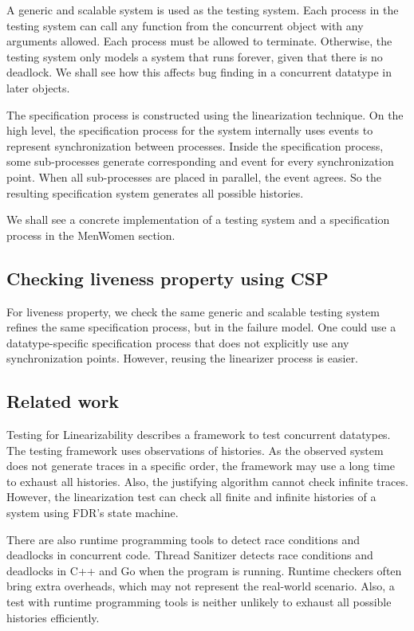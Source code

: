 \documentclass[a4paper, 12pt]{article}
\begin{document}
A generic and scalable system is used as the testing system. Each process in the testing system can call any function from the concurrent object with any arguments allowed. Each process must be allowed to terminate. Otherwise, the testing system only models a system that runs forever, given that there is no deadlock. We shall see how this affects bug finding in a concurrent datatype in later objects.

The specification process is constructed using the linearization technique. On the high level, the specification process for the system internally uses  events to represent synchronization between processes. Inside the specification process, some sub-processes generate corresponding  and  event for every synchronization point. When all sub-processes are placed in parallel, the  event agrees. So the resulting specification system generates all possible histories. 

We shall see a concrete implementation of a testing system and a specification process in the MenWomen section. 

\subsection{Checking liveness property using CSP}
For liveness property, we check the same generic and scalable testing system refines the same specification process, but in the failure model. One could use a datatype-specific specification process that does not explicitly use any synchronization points. However, reusing the linearizer process is easier. 

\subsection{Related work}
Testing for Linearizability \cite{linearizability-testing} describes a framework to test concurrent datatypes. The testing framework uses observations of histories. As the observed system does not generate traces in a specific order, the framework may use a long time to exhaust all histories. Also, the justifying algorithm cannot check infinite traces. However, the linearization test can check all finite and infinite histories of a system using FDR's state machine. 

There are also runtime programming tools to detect race conditions and deadlocks in concurrent code. Thread Sanitizer \cite{threadsanitizer} detects race conditions and deadlocks in C++ and Go when the program is running. Runtime checkers often bring extra overheads, which may not represent the real-world scenario. Also, a test with runtime programming tools is neither unlikely to exhaust all possible histories efficiently. 
\end{document}
